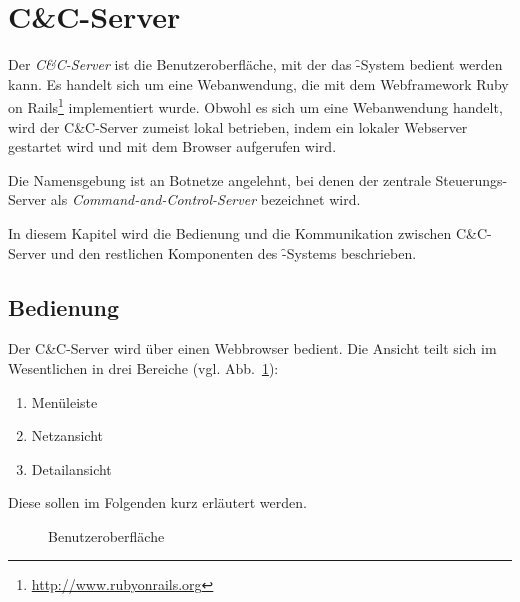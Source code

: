 \section{C\&C-Server}
\label{sec:candc}
\authors{\BK \and \MW}{\DE \and \HM \and \LM \and \JF \and \AB}

Der \textit{C\&C-Server} ist die Benutzeroberfläche, mit der das \f-System
bedient werden kann. Es handelt sich um eine Webanwendung, die mit dem
Webframework Ruby on Rails\footnote{\url{http://www.rubyonrails.org}}
implementiert wurde. Obwohl es sich um eine Webanwendung handelt, wird
der C\&C-Server zumeist lokal betrieben, indem ein lokaler Webserver gestartet
wird und mit dem Browser aufgerufen wird.

Die Namensgebung ist an Botnetze angelehnt, bei denen der zentrale
Steuerungs-Server als \textit{Command-and-Control-Server} bezeichnet wird.

In diesem Kapitel wird die Bedienung und die Kommunikation zwischen C\&C-Server
und den restlichen Komponenten des \f-Systems beschrieben.

\subsection{Bedienung}

Der C\&C-Server wird über einen Webbrowser bedient. Die Ansicht teilt sich
im Wesentlichen in drei Bereiche (vgl. Abb.~\ref{fig:candc_screen}):

\begin{enumerate}
  \item Menüleiste
  \item Netzansicht
  \item Detailansicht
\end{enumerate}

Diese sollen im Folgenden kurz erläutert werden.

\begin{figure}
  \centering
  \caption{Benutzeroberfläche}
  \label{fig:candc_screen}
\end{figure}

